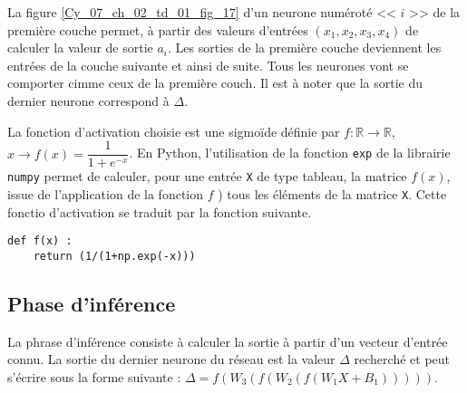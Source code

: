 La figure \ref{Cy_07_ch_02_td_01_fig_17} d'un neurone numéroté << $i$ >> de la première couche permet, à partir des valeurs d'entrées $\left(x_1, x_2, x_3, x_4 \right)$ de calculer la valeur de sortie $a_i$. Les sorties de la première couche deviennent les entrées de la couche suivante et ainsi de suite. Tous les neurones vont se comporter cimme ceux de la première couch. Il est à noter que la sortie du dernier neurone correspond à $\Delta$.




La fonction d'activation choisie est une sigmoïde définie par $f: \mathbb{R} \to \mathbb{R}$, $x\to f(x) = \dfrac{1}{1+e^{-x}}$. En Python, l'utilisation de la fonction \lstinline{exp} de la librairie \lstinline{numpy} permet de calculer, pour une entrée \lstinline{X} de type tableau, la matrice $f(x)$, issue de l'application de la fonction $f$ ) tous les éléments de la matrice \lstinline{X}. Cette fonctio d'activation se traduit par la fonction suivante.
\begin{lstlisting}
def f(x) :
    return (1/(1+np.exp(-x)))
\end{lstlisting}


\ifprof
\begin{corrige}
\end{corrige}
\else
\fi

\subsection*{Phase d'inférence}
%
%
La phrase d'inférence consiste à calculer la sortie à partir d'un vecteur d'entrée connu. La sortie du dernier neurone du réseau est la valeur $\Delta$ recherché et peut s'écrire sous la forme suivante : 
$\Delta = f\left(W_3\left(f\left(W_2\left(f\left(W_1 X + B_1\right)\right)\right)\right)\right)$.
%


